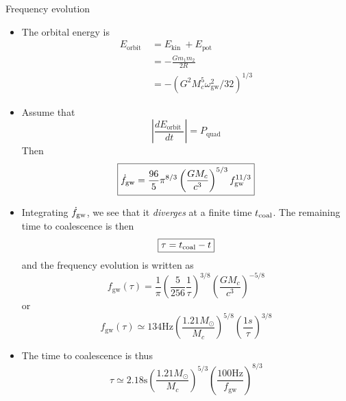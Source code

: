 \documentclass[size=11pt,style=paintings]{powerdot}
\begin{document}
\begin{slide}{Frequency evolution}
 \begin{itemize}
 \item The orbital energy is 
 $$
\begin{aligned} E_{\text {orbit }} &=E_{\text {kin }}+E_{\text {pot }} \\ &=-\frac{G m_{1} m_{2}}{2 R} \\
&=-\left(G^{2} M_{c}^{5} \omega_{\mathrm{gw}}^{2} / 32\right)^{1 / 3}
\end{aligned}
$$
\item Assume that
$$ \left |\frac{dE_{\text {orbit }}}{dt} \right|=P_{\mathrm{quad}}
$$ 
Then 
$$
\boxed{\dot{f}_{\rm g w}=\frac{96}{5} \pi^{8 / 3}\left(\frac{G M_{c}}{c^{3}}\right)^{5 / 3} f_{\rm g w}^{11 / 3}}
$$
 \end{itemize}
 \end{slide}


\begin{slide}{}
 \begin{itemize}
 \item Integrating $\dot{f}_{\rm g w}$, we see that it \textit{diverges} at a finite time
$t_{\rm coal}$.
The remaining time to coalescence is then 
$$\boxed{\tau = t_{\rm coal}-t}$$
and the frequency evolution is written as
$$
f_{\mathrm{gw}}(\tau)=\frac{1}{\pi}\left(\frac{5}{256} \frac{1}{\tau}\right)^{3 / 8}\left(\frac{G M_{c}}{c^{3}}\right)^{-5 / 8}
$$
or
$$
\boxed{f_{\mathrm{gw}}(\tau) \simeq 134 \mathrm{Hz}\left(\frac{1.21 M_{\odot}}{M_{c}}\right)^{5 / 8}\left(\frac{1 s}{\tau}\right)^{3 / 8}}
$$
\item The time to coalescence is thus
$$
\boxed{\tau \simeq 2.18 \mathrm{s}\left(\frac{1.21 M_{\odot}}{M_{c}}\right)^{5 / 3}\left(\frac{100 \mathrm{Hz}}{f_{\mathrm{gw}}}\right)^{8 / 3}}
$$
 \end{itemize}
 \end{slide}
\end{document}
